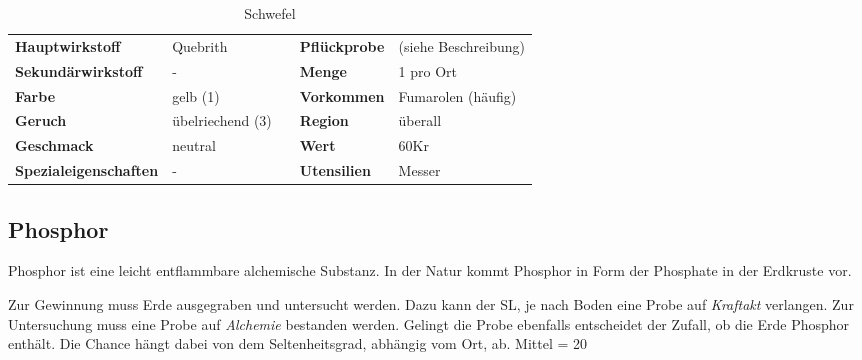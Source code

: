 \begin{table}[h] 
\begin{center} 
\begin{tabular}{|l|l|p{1cm}|l|l|} 
  	\cline{1-2} \cline{4-5} 
  	\textbf{Hauptwirkstoff} & Quebrith && \textbf{Pflückprobe} & (siehe Beschreibung) \\ \cline{1-2} \cline{4-5} 
  	\textbf{Sekundärwirkstoff} & - && \textbf{Menge} & 1 pro Ort \\ \cline{1-2} \cline{4-5} 
  	\textbf{Farbe} & gelb (1) && \textbf{Vorkommen} & Fumarolen (häufig) \\ \cline{1-2} \cline{4-5} 
  	\textbf{Geruch} & übelriechend (3) && \textbf{Region} & überall \\ \cline{1-2} \cline{4-5} 
  	\textbf{Geschmack} & neutral && \textbf{Wert} & 60Kr \\ \cline{1-2} \cline{4-5} 
  	\textbf{Spezialeigenschaften} & - && \textbf{Utensilien} & Messer \\ \cline{1-2} \cline{4-5} 
\end{tabular} 
\end{center} 
\caption{Schwefel} 
\label{tab:schwefel} 
\end{table}


\subsection{Phosphor}
Phosphor ist eine leicht entflammbare alchemische Substanz. In der Natur kommt Phosphor in Form der Phosphate in der Erdkruste vor. 

Zur Gewinnung muss Erde ausgegraben und untersucht werden. Dazu kann der SL, je nach Boden eine Probe auf \textit{Kraftakt} verlangen. Zur Untersuchung muss eine Probe auf \textit{Alchemie} bestanden werden. Gelingt die Probe ebenfalls entscheidet der Zufall, ob die Erde Phosphor enthält. Die Chance hängt dabei von dem Seltenheitsgrad, abhängig vom Ort, ab. Mittel = 20%

